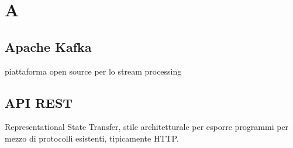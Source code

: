 \section*{A}
\subsection*{Apache Kafka  }
piattaforma open source per lo stream processing
\subsection*{API REST}
Representational State Transfer, stile architetturale per esporre programmi per mezzo  di protocolli esistenti, tipicamente HTTP. 
